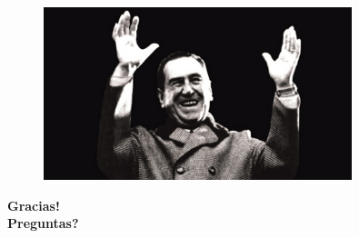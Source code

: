 \documentclass[xcolor={dvipsnames}]{beamer}
\begin{document}
\begin{frame}
  \vspace{-0.8cm}
  \begin{center}
    \begin{figure}
    \includegraphics[width = 0.8\textwidth]{./assets/peron1.jpg}
    \end{figure}
    \Large{\textbf{Gracias! \\ Preguntas?}}
  \end{center}
\end{frame}
\end{document}
